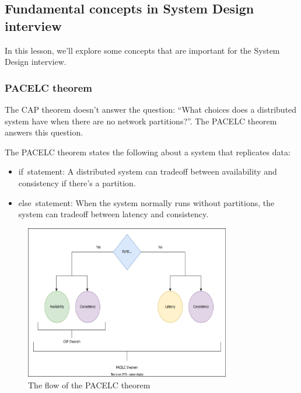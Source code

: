 \subsection{Fundamental concepts in System Design interview}\label{6AuT2aNjnlxXD_1OxAsQN}

In this lesson, we'll explore some concepts that are important for the System Design interview.

\subsubsection{PACELC theorem}\label{fmWp0a_r8F2Lmz_1Z5SxJ}

The CAP theorem doesn't answer the question: ``What choices does a distributed system have when there are no network partitions?''. The PACELC theorem answers this question.

The PACELC theorem states the following about a system that replicates data:

\begin{itemize}
\item
{}\label{oiv9GjYixGLMIND24PUeH}
if\ statement: A distributed system can tradeoff between availability and consistency if there's a partition.
\item
{}\label{dWs-lwrWIqBLFxlX6tEZj}
else\ statement: When the system normally runs without partitions, the system can tradeoff between latency and consistency.
\end{itemize}

\begin{figure}[htbp]
 \centering
 \includegraphics[width=0.8\textwidth]{Images/chapter_1/section_4705505809661952/5540989725179904.png}
 \caption{The flow of the PACELC theorem}
\end{figure}

